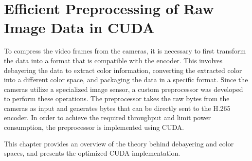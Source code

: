 \chapter{Efficient Preprocessing of Raw Image Data in CUDA}
\label{chap:debayer}

To compress the video frames from the cameras, it is necessary to first transform the data into a format that is compatible with the encoder.
This involves debayering the data to extract color information, converting the extracted color into a different color space, and packaging the data in a specific format.
Since the cameras utilize a specialized image sensor, a custom preprocessor was developed to perform these operations.
The preprocessor takes the raw bytes from the cameras as input and generates bytes that can be directly sent to the H.265 encoder.
In order to achieve the required throughput and limit power consumption, the preprocessor is implemented using CUDA.

This chapter provides an overview of the theory behind debayering and color spaces, and presents the optimized CUDA implementation.

